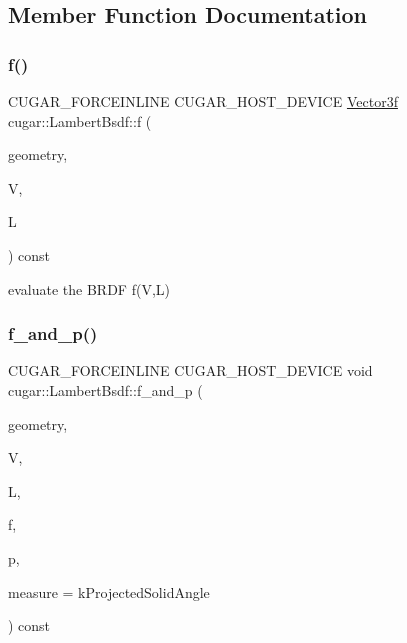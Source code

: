 \subsection{Member Function Documentation}
\mbox{\label{structcugar_1_1_lambert_bsdf_a42aa3e5967a4dfbf2ba3b1793ebfdf9e}} 
\subsubsection{\texorpdfstring{f()}{f()}}
{\footnotesize\ttfamily C\+U\+G\+A\+R\+\_\+\+F\+O\+R\+C\+E\+I\+N\+L\+I\+NE C\+U\+G\+A\+R\+\_\+\+H\+O\+S\+T\+\_\+\+D\+E\+V\+I\+CE \hyperlink{structcugar_1_1_vector}{Vector3f} cugar\+::\+Lambert\+Bsdf\+::f (\begin{DoxyParamCaption}\item[{const \hyperlink{structcugar_1_1_differential_geometry}{Differential\+Geometry} \&}]{geometry,  }\item[{const \hyperlink{structcugar_1_1_vector}{Vector3f}}]{V,  }\item[{const \hyperlink{structcugar_1_1_vector}{Vector3f}}]{L }\end{DoxyParamCaption}) const\hspace{0.3cm}{\ttfamily [inline]}}

evaluate the B\+R\+DF f(\+V,\+L) \mbox{\label{structcugar_1_1_lambert_bsdf_a0d594961bb1867eef9e20ef2fd7f260f}} 
\subsubsection{\texorpdfstring{f\+\_\+and\+\_\+p()}{f\_and\_p()}}
{\footnotesize\ttfamily C\+U\+G\+A\+R\+\_\+\+F\+O\+R\+C\+E\+I\+N\+L\+I\+NE C\+U\+G\+A\+R\+\_\+\+H\+O\+S\+T\+\_\+\+D\+E\+V\+I\+CE void cugar\+::\+Lambert\+Bsdf\+::f\+\_\+and\+\_\+p (\begin{DoxyParamCaption}\item[{const \hyperlink{structcugar_1_1_differential_geometry}{Differential\+Geometry} \&}]{geometry,  }\item[{const \hyperlink{structcugar_1_1_vector}{Vector3f}}]{V,  }\item[{const \hyperlink{structcugar_1_1_vector}{Vector3f}}]{L,  }\item[{\hyperlink{structcugar_1_1_vector}{Vector3f} \&}]{f,  }\item[{float \&}]{p,  }\item[{const Spherical\+Measure}]{measure = {\ttfamily kProjectedSolidAngle} }\end{DoxyParamCaption}) const\hspace{0.3cm}{\ttfamily [inline]}}

